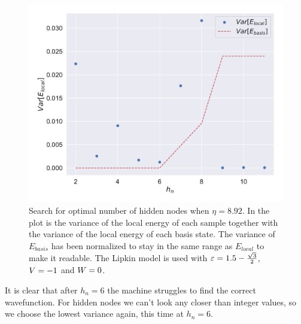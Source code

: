 \begin{figure}[H]
  \begin{center}
    \includegraphics[width=\optgridwidhtratio\textwidth]{Figures/Plots/OPt/Lipkin/[2][hidden_n][e=500][2-11].pdf}
  \end{center}
  \caption{Search for optimal number of hidden nodes when $\eta = 8.92$. In the plot is the variance of the local energy of each sample together with the variance of the local energy of each basis state. The variance of $E_{basis}$ has been normalized to stay in the same range as $E_{local}$ to make it readable. The Lipkin model is used with $\varepsilon = 1.5 - \frac{\sqrt{3}}{2}$, $V = -1$ and $W = 0$.}\label{fig:hn_depth1}
\end{figure}

It is clear that after $h_n = 6$ the machine struggles to find the correct wavefunction. For hidden nodes we can't look any closer than integer values, so we choose the lowest variance again, this time at $h_n = 6$. 


